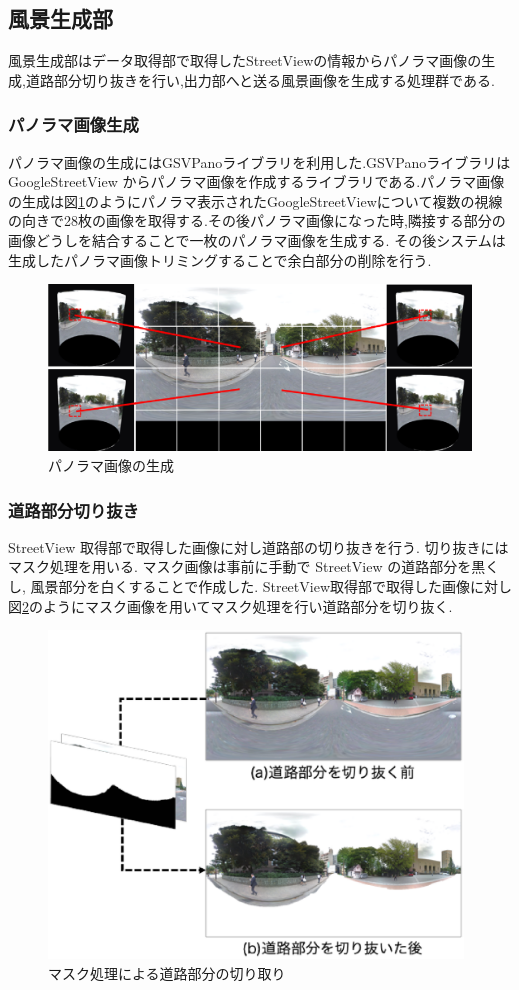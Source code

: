 \subsection{風景生成部}
風景生成部はデータ取得部で取得したStreetViewの情報からパノラマ画像の生成,道路部分切り抜きを行い,出力部へと送る風景画像を生成する処理群である.
\subsubsection{パノラマ画像生成}
パノラマ画像の生成にはGSVPanoライブラリを利用した\cite{GSVpano}.GSVPanoライブラリはGoogleStreetView からパノラマ画像を作成するライブラリである.パノラマ画像の生成は図\ref{figure:panorama}のようにパノラマ表示されたGoogleStreetViewについて複数の視線の向きで28枚の画像を取得する.その後パノラマ画像になった時,隣接する部分の画像どうしを結合することで一枚のパノラマ画像を生成する.
その後システムは生成したパノラマ画像トリミングすることで余白部分の削除を行う.

\begin{figure}[ht]
\begin{center}
\includegraphics[width=17cm]{img/04_detail/make_panorama.eps}
\end{center}
\caption{パノラマ画像の生成}
\label{figure:panorama}
\end{figure} 

\clearpage

\subsubsection{道路部分切り抜き}
StreetView 取得部で取得した画像に対し道路部の切り抜きを行う. 切り抜きにはマスク処理を用いる. マスク画像は事前に手動で StreetView の道路部分を黒くし, 風景部分を白くすることで作成した. StreetView取得部で取得した画像に対し図\ref{figure:trim}のようにマスク画像を用いてマスク処理を行い道路部分を切り抜く.


\begin{figure}[h]
\begin{center}
\includegraphics[width=11cm]{img/04_detail/triming.eps} 
\end{center}
\caption{マスク処理による道路部分の切り取り}
\label{figure:trim}
\end{figure} 